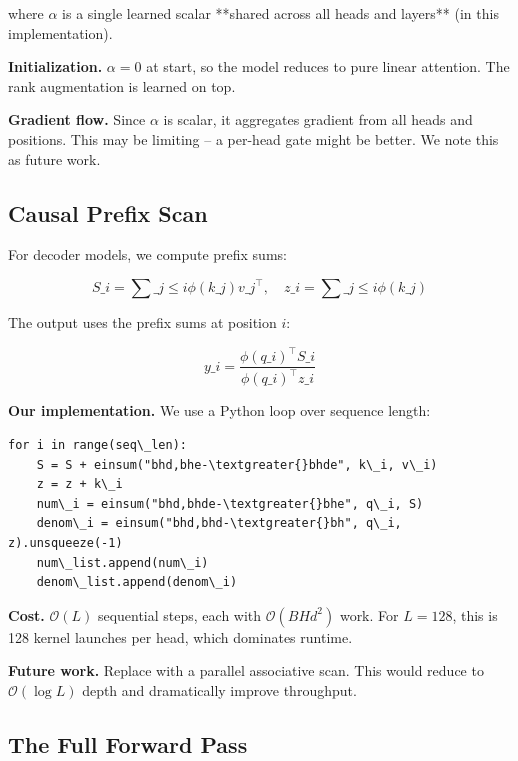 where $\alpha$ is a single learned scalar **shared across all heads and 
layers** (in this implementation).

\textbf{Initialization.} $\alpha = 0$ at start, so the model reduces to pure 
linear attention. The rank augmentation is learned on top.

\textbf{Gradient flow.} Since $\alpha$ is scalar, it aggregates gradient from all 
heads and positions. This may be limiting -- a per-head gate might be better. 
We note this as future work.

\subsection{Causal Prefix Scan}

For decoder models, we compute prefix sums:

\[
S\_i = \sum\_{j \le i} \phi(k\_j) v\_j^\top, \quad
z\_i = \sum\_{j \le i} \phi(k\_j)
\tag{4.6}
\]

The output uses the prefix sums at position $i$:

\[
y\_i = \frac{\phi(q\_i)^\top S\_i}{\phi(q\_i)^\top z\_i}
\tag{4.7}
\]

\textbf{Our implementation.} We use a Python loop over sequence length:

\begin{lstlisting}
for i in range(seq\_len):
    S = S + einsum("bhd,bhe-\textgreater{}bhde", k\_i, v\_i)
    z = z + k\_i
    num\_i = einsum("bhd,bhde-\textgreater{}bhe", q\_i, S)
    denom\_i = einsum("bhd,bhd-\textgreater{}bh", q\_i, z).unsqueeze(-1)
    num\_list.append(num\_i)
    denom\_list.append(denom\_i)
\end{lstlisting}

\textbf{Cost.} $\mathcal{O}(L)$ sequential steps, each with $\mathcal{O}(BH d^2)$ 
work. For $L = 128$, this is 128 kernel launches per head, which dominates 
runtime.

\textbf{Future work.} Replace with a parallel associative scan. This would reduce 
to $\mathcal{O}(\log L)$ depth and dramatically improve throughput.

\subsection{The Full Forward Pass}


